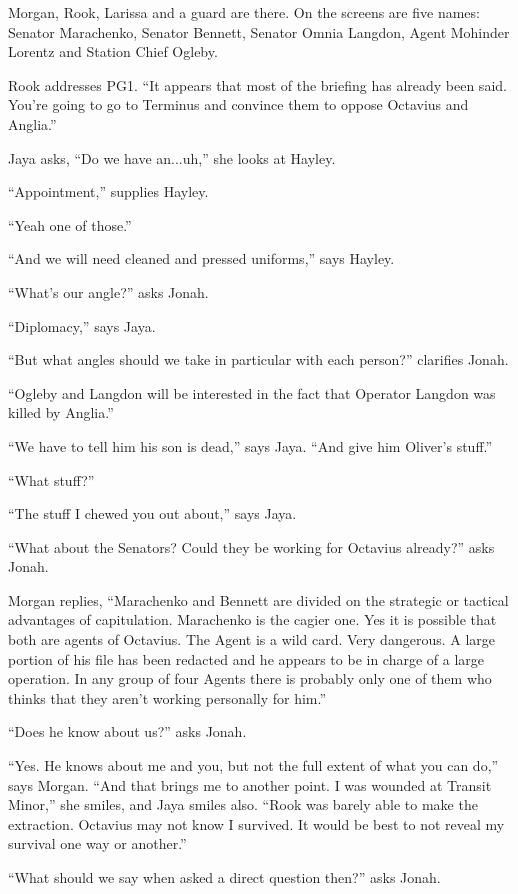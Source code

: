 Morgan, Rook, Larissa and a guard are there.  On the screens are five names: Senator Marachenko, Senator Bennett, Senator Omnia Langdon, Agent Mohinder Lorentz and Station Chief Ogleby.



Rook addresses PG1. ``It appears that most of the briefing has already been said.  You're going to go to Terminus and convince them to oppose Octavius and Anglia.''

Jaya asks, ``Do we have an...uh,'' she looks at Hayley.

``Appointment,'' supplies Hayley.

``Yeah one of those.''

``And we will need cleaned and pressed uniforms,'' says Hayley.

``What's our angle?'' asks Jonah.

``Diplomacy,'' says Jaya.

``But what angles should we take in particular with each person?'' clarifies Jonah.

``Ogleby and Langdon will be interested in the fact that Operator Langdon was killed by Anglia.''

``We have to tell him his son is dead,'' says Jaya.  ``And give him Oliver's stuff.''

``What stuff?''

``The stuff I chewed you out about,'' says Jaya.

``What about the Senators?  Could they be working for Octavius already?'' asks Jonah.

Morgan replies, ``Marachenko and Bennett are divided on the strategic or tactical advantages of capitulation.  Marachenko is the cagier one.  Yes it is possible that both are agents of Octavius.  The Agent is a wild card. Very dangerous.  A large portion of his file has been redacted and he appears to be in charge of a large operation.  In any group of four Agents there is probably only one of them who thinks that they aren't working personally for him.''

``Does he know about us?'' asks Jonah.

``Yes.  He knows about me and you, but not the full extent of what you can do,'' says Morgan.  ``And that brings me to another point.  I was wounded at Transit Minor,'' she smiles, and Jaya smiles also.  ``Rook was barely able to make the extraction.  Octavius may not know I survived.  It would be best to not reveal my survival one way or another.''

``What should we say when asked a direct question then?'' asks Jonah.

